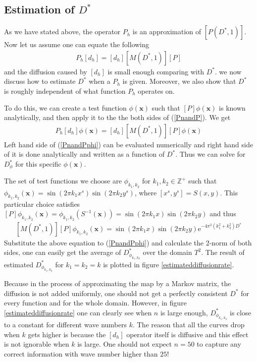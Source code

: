 

\subsection{Estimation of $D^*$}
As we have stated above, the operator $P_h$ is an approximation of
$[P(D^*,1)]$. Now let us assume one can equate the following
\begin{eqnarray}
\label{PnandP}
 P_h[d_h] = [d_h][M(D^*,1)][P]
\end{eqnarray}
and the diffusion caused by $[d_h]$ is small enough comparing with
$D^*$. we now discuss how to estimate $D^*$ when a $P_h$ is given.
Moreover, we also show that $D^*$ is roughly independent of what
function $P_h$ operates on.


To do this, we can create a test function $\phi(\mathbf{x})$ such
that $[P]\phi(\mathbf{x})$ is known analytically, and then apply it
to the the both sides of (\ref{PnandP}). We get
\begin{eqnarray}
\label{PnandPphi}
 P_h[d_h]\phi(\mathbf{x}) = [d_h][M(D^*,1)][P]\phi(\mathbf{x})
\end{eqnarray}
Left hand side of (\ref{PnandPphi}) can be evaluated numerically and
right hand side of it is done analytically and written as a function
of $D^*$. Thus we can solve for $D^*_\phi$ for this specific
$\phi(\mathbf{x})$.

The set of test functions we choose are $\phi_{k_1,k_2}$ for
$k_1,k_2\in \mathbb{Z}^+$ such that $\phi_{k_1,k_2}(\mathbf{x}) =
\sin(2\pi k_1 x^s)\sin(2 \pi k_2 y^s)$, where $[x^s , y^s]=S(x,y)$.
This particular choice satisfies $[P]\phi_{k_1,k_2}(\mathbf{x})=
\phi_{k_1,k_2}(S^{-1}(\mathbf{x})) = \sin(2\pi k_1 x)\sin(2 \pi k_2
y)$ and thus
\begin{eqnarray}
\label{MPphi}
 [M(D^*,1)][P]\phi_{k_1,k_2}(\mathbf{x}) = \sin(2\pi k_1 x)\sin(2 \pi k_2
y)\text{e}^{-4 \pi^2 (k_1^2+k_2^2)D^*}
\end{eqnarray}
Substitute the above equation to (\ref{PnandPphi}) and calculate the
2-norm of both sides, one can easily get the average of
$D^*_{\phi_{k_1,k_2}}$ over the domain $T^2$. The result of
estimated $D^*_{\phi_{k_1,k_2}}$ for $k_1=k_2 = k$ is plotted in
figure \ref{estimateddiffusionrate}.

Because in the process of approximating the map by a Markov matrix,
the diffusion is not added uniformly, one should not get a perfectly
consistent $D^*$ for every function and for the whole domain.
However, in figure \ref{estimateddiffusionrate} one can clearly see
when $n$ is large enough, $D^*_{\phi_{k_1,k_2}}$ is close to a
constant for different wave numbers $k$. The reason that all the
curves drop when $k$ gets higher is because the $[d_h]$ operator
itself is diffusive and this effect is not ignorable when $k$ is
large. One should not expect $n=50$ to capture any correct
information with wave number higher than $25$!


